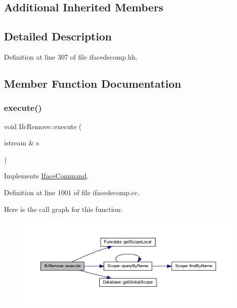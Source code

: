 \subsection*{Additional Inherited Members}


\subsection{Detailed Description}


Definition at line 307 of file ifacedecomp.\+hh.



\subsection{Member Function Documentation}
\mbox{\label{class_ifc_remove_a170d67940736747f8043483426214f54}} 
\subsubsection{\texorpdfstring{execute()}{execute()}}
{\footnotesize\ttfamily void Ifc\+Remove\+::execute (\begin{DoxyParamCaption}\item[{istream \&}]{s }\end{DoxyParamCaption})\hspace{0.3cm}{\ttfamily [virtual]}}



Implements \mbox{\hyperlink{class_iface_command_af10e29cee2c8e419de6efe9e680ad201}{Iface\+Command}}.



Definition at line 1001 of file ifacedecomp.\+cc.

Here is the call graph for this function\+:
\nopagebreak
\begin{figure}[H]
\begin{center}
\leavevmode
\includegraphics[width=350pt]{class_ifc_remove_a170d67940736747f8043483426214f54_cgraph}
\end{center}
\end{figure}



